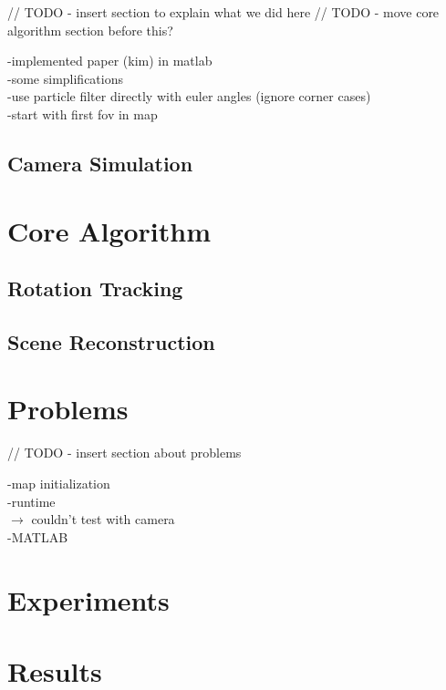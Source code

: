 \documentclass[10pt,twocolumn,letterpaper]{article}
\begin{document}
// TODO - insert section to explain what we did here
// TODO - move core algorithm section before this?

-implemented paper (kim) in matlab\\
-some simplifications\\
    -use particle filter directly with euler angles (ignore corner cases)\\
    -start with first fov in map\\

\subsection{Camera Simulation}





\section{Core Algorithm}


\subsection{Rotation Tracking}


\subsection{Scene Reconstruction}



\section{Problems}
// TODO - insert section about problems

-map initialization\\
-runtime\\
$\rightarrow$ couldn't test with camera\\
-MATLAB\\


\section{Experiments}



\section{Results}



{\small


}
\end{document}
